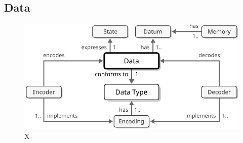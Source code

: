\subsection{Data}
\label{sec:reference-model:data}

\begin{figure}[ht!]
  \centering
  \includegraphics{figures/data}
  \caption{
    X
  }
  \label{fig:data}
\end{figure}